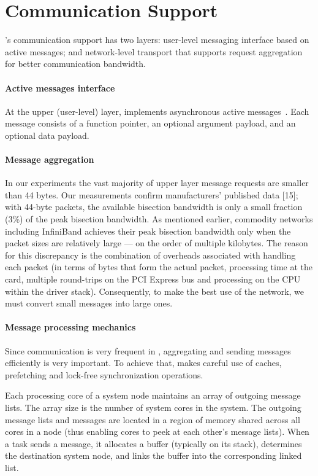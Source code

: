 \section{Communication Support}
\label{sec:communication}

\Grappa's communication support has two layers: user-level messaging interface
based on active messages; and network-level transport that supports request
aggregation for better communication bandwidth.

\paragraph{Active messages interface} At the upper (user-level) layer, \Grappa
implements asynchronous active messages~\cite{vonEicken92}. Each message
consists of a function pointer, an optional argument payload, and an optional
data payload. 

\paragraph{Message aggregation} In our experiments the vast majority of upper
layer message requests are smaller than 44 bytes. Our measurements confirm
manufacturers' published data [15]; with 44-byte packets, the available
bisection bandwidth is only a small fraction (3\%) of the peak bisection
bandwidth. As mentioned earlier, commodity networks including InfiniBand
achieves their peak bisection bandwidth only when the packet sizes are
relatively large --- on the order of multiple kilobytes. The reason for this
discrepancy is the combination of overheads associated with handling each
packet (in terms of bytes that form the actual packet, processing time at the
card, multiple round-trips on the PCI Express bus and processing on the CPU
within the driver stack). Consequently, to make the best use of the network,
we must convert small messages into large ones.

\paragraph{Message processing mechanics} Since communication is very frequent
in \Grappa, aggregating and sending messages efficiently is very important. To
achieve that, \Grappa makes careful use of caches, prefetching and lock-free
synchronization operations.

Each processing core of a system node maintains an array of outgoing message lists.  The array size is the number of system cores in the \Grappa system.   The outgoing message lists and messages are located in a region of memory shared across all cores in a \Grappa node (thus enabling cores to peek at each other's message lists). When a task sends a message, it allocates a buffer (typically on its stack), determines the destination system node, and links the buffer into the corresponding linked list.

